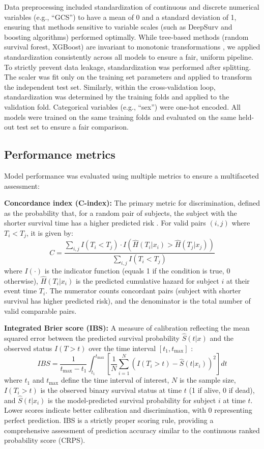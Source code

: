 \documentclass[pdflatex,sn-mathphys-num]{sn-jnl}%
\theoremstyle{thmstyleone}%
\theoremstyle{thmstyletwo}%
\theoremstyle{thmstylethree}%
\begin{document}
Data preprocessing included standardization of continuous and discrete numerical variables (e.g., ``GCS'') to have a mean of 0 and a standard deviation of 1, ensuring that methods sensitive to variable scales (such as DeepSurv and boosting algorithms) performed optimally. While tree-based methods (random survival forest, XGBoost) are invariant to monotonic transformations \cite{hastie2009elements}, we applied standardization consistently across all models to ensure a fair, uniform pipeline. To strictly prevent data leakage, standardization was performed after splitting. The scaler was fit only on the training set parameters and applied to transform the independent test set. Similarly, within the cross-validation loop, standardization was determined by the training folds and applied to the validation fold. Categorical variables (e.g., ``sex'') were one-hot encoded. All models were trained on the same training folds and evaluated on the same held-out test set to ensure a fair comparison.

\subsection{Performance metrics}
Model performance was evaluated using multiple metrics to ensure a multifaceted assessment:

\textbf{Concordance index (C-index):} The primary metric for discrimination, defined as the probability that, for a random pair of subjects, the subject with the shorter survival time has a higher predicted risk \cite{harrell1982evaluating}. For valid pairs $(i, j)$ where $T_i < T_j$, it is given by:
\begin{equation}
C = \frac{\sum_{i,j} I(T_i < T_j) \cdot I(\hat{H}(T_i|x_i) > \hat{H}(T_j|x_j))}{\sum_{i,j} I(T_i < T_j)}
\end{equation}
where $I(\cdot)$ is the indicator function (equals 1 if the condition is true, 0 otherwise), $\hat{H}(T_i|x_i)$ is the predicted cumulative hazard for subject $i$ at their event time $T_i$. The numerator counts concordant pairs (subject with shorter survival has higher predicted risk), and the denominator is the total number of valid comparable pairs.

\textbf{Integrated Brier score (IBS):} A measure of calibration reflecting the mean squared error between the predicted survival probability $\hat{S}(t|x)$ and the observed status $I(T > t)$ over the time interval $[t_1, t_{\max}]$ \cite{graf1999assessment}:
\begin{equation}
IBS = \frac{1}{t_{\max} - t_1} \int_{t_1}^{t_{\max}} \left[ \frac{1}{N} \sum_{i=1}^{N} \left( I(T_i > t) - \hat{S}(t|x_i) \right)^2 \right] dt
\end{equation}
where $t_1$ and $t_{\max}$ define the time interval of interest, $N$ is the sample size, $I(T_i > t)$ is the observed binary survival status at time $t$ (1 if alive, 0 if dead), and $\hat{S}(t|x_i)$ is the model-predicted survival probability for subject $i$ at time $t$.
Lower scores indicate better calibration and discrimination, with 0 representing perfect prediction. IBS is a strictly proper scoring rule, providing a comprehensive assessment of prediction accuracy similar to the continuous ranked probability score (CRPS).
\end{document}
